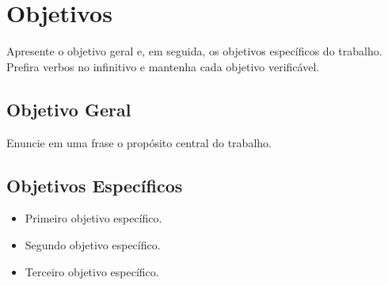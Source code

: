\section{Objetivos}

Apresente o objetivo geral e, em seguida, os objetivos específicos do trabalho.
Prefira verbos no infinitivo e mantenha cada objetivo verificável.

\subsection{Objetivo Geral}

Enuncie em uma frase o propósito central do trabalho.

\subsection{Objetivos Específicos}

\begin{itemize}
  \item Primeiro objetivo específico.
  \item Segundo objetivo específico.
  \item Terceiro objetivo específico.
\end{itemize}
